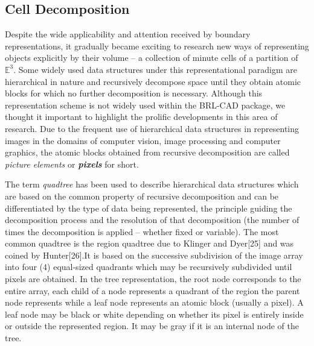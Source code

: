 \subsection{Cell Decomposition}

\hspace{30} Despite   the   wide   applicability   and   attention   received   by   boundary  
representations,   it   gradually   became   exciting   to   research   new   ways   of  
representing   objects   explicitly   by   their   volume   –   a   collection   of   minute   cells   of   a  
partition   of   $\mathbb{E}^3 $.   Some   widely   used   data   structures   under  
this   representational   paradigm   are   hierarchical   in   nature   and   recursively  
decompose   space   until   they   obtain   atomic   blocks   for   which   no   further  
 decomposition   is   necessary.   Although   this   representation   scheme   is   not   widely  
used   within   the   BRL-­CAD   package,   we   thought   it   important   to   highlight   the   prolific  
developments   in   this   area   of   research.   Due   to   the   frequent   use   of   hierarchical  
data   structures   in   representing   images   in   the   domains   of   computer   vision,  
image   processing   and   computer   graphics,   the   atomic   blocks   obtained   from  
recursive decomposition are called \textit{picture elements} or \textbf{\textit{pixels}} for short. 

\hspace{30} The   term   \textit{quadtree}   has   been   used   to   describe   hierarchical   data  
structures   which   are   based   on   the   common   property   of   recursive  
decomposition   and   can   be   differentiated   by   the   type   of   data   being   represented,  
the   principle   guiding   the   decomposition   process   and   the   resolution   of   that  
decomposition   (the   number   of   times   the   decomposition   is   applied   –   whether  
fixed   or   variable).   The   most   common   quadtree   is   the   region   quadtree   due   to  
Klinger   and   Dyer[25]   and   was   coined   by   Hunter[26].It   is   based   on   the  
successive   subdivision   of   the   image   array   into   four   (4)   equal-­sized   quadrants  
which   may   be   recursively   subdivided   until   pixels   are   obtained.   In   the   tree  
representation,   the   root   node   corresponds   to   the   entire   array,   each   child   of   a  
node   represents   a   quadrant   of   the   region   the   parent   node   represents   while   a  
leaf   node   represents   an   atomic   block   (usually   a   pixel).   A   leaf   node   may   be  
black   or   white   depending   on   whether   its   pixel   is   entirely   inside   or   outside   the  
represented region. It may be gray if it is an internal node of the tree.  

